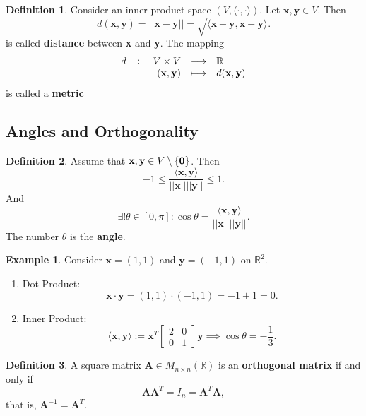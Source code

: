 \documentclass[12pt,openany]{book}
\theoremstyle{definition}
\newtheorem{definition}{Definition}[chapter]
\newtheorem{example}{Example}[chapter]
\newcommand{\R}{\mathbb{R}}
\newcommand{\by}{\times}
\newcommand{\inner}[1]{\langle #1\rangle}
\newcommand{\norms}[1]{|| #1||}
\begin{document}
	\begin{tcolorbox}[colframe=defcolor,title={\color{white}\bf Distance and Metric}]
		\begin{definition}
			Consider an inner product space \((V,\inner{\cdot,\cdot})\). Let \(\textbf{x},\textbf{y}\in V\). Then \[
			d(\textbf{x},\textbf{y})=\norms{\textbf{x}-\textbf{y}}=\sqrt{\inner{\textbf{x}-\textbf{y},\textbf{x}-\textbf{y}}}.
			\] is called \textbf{distance} between \textbf{x} and \textbf{y}. The mapping \[
			\fullfunction{d}{V\times V}{\R}{(\textbf{x},\textbf{y})}{d(\textbf{x},\textbf{y})}
			\] is called a \textbf{metric}
		\end{definition}
	\end{tcolorbox}

	\subsection{Angles and Orthogonality}
	\begin{tcolorbox}[colframe=defcolor,title={\color{white}\bf Angle}]
		\begin{definition}
			Assume that \(\textbf{x},\textbf{y}\in V\setminus\set{\textbf{0}}\). Then \[
			-1\leq\frac{\inner{\textbf{x},\textbf{y}}}{\norms{\textbf{x}}\norms{\textbf{y}}}\leq 1.
			\] And \[
			\exists !\theta\in[0,\pi]:\cos\theta=\frac{\inner{\textbf{x},\textbf{y}}}{\norms{\textbf{x}}\norms{\textbf{y}}}.
			\] The number \(\theta\) is the \textbf{angle}.
		\end{definition}
	\end{tcolorbox}
	\begin{example}
		Consider \(\textbf{x}=(1,1)\) and \(\textbf{y}=(-1,1)\) on \(\R^2\).
		\begin{enumerate}[(1)]
			\item Dot Product: \[
			\textbf{x}\cdot \textbf{y}=(1,1)\cdot(-1,1)=-1+1=0.
			\]
			\item Inner Product: \[
			\inner{\textbf{x},\textbf{y}}:=\textbf{x}^T\begin{bmatrix}
				2&0\\0&1
			\end{bmatrix}\textbf{y}\implies\cos\theta=-\frac{1}{3}.
			\]
		\end{enumerate}
	\end{example}
	\vspace{8pt}
	\begin{tcolorbox}[colframe=defcolor,title={\color{white}\bf Orthogonal Matrix}]
		\begin{definition}
			A square matrix \(\textbf{A}\in M_{n\by n}(\R)\) is an \textbf{orthogonal matrix} if and only if \[
			\textbf{A}\textbf{A}^T=I_n=\textbf{A}^T\textbf{A},
			\] that is, \(\textbf{A}^{-1}=\textbf{A}^T\).
		\end{definition}
	\end{tcolorbox}
\end{document}
